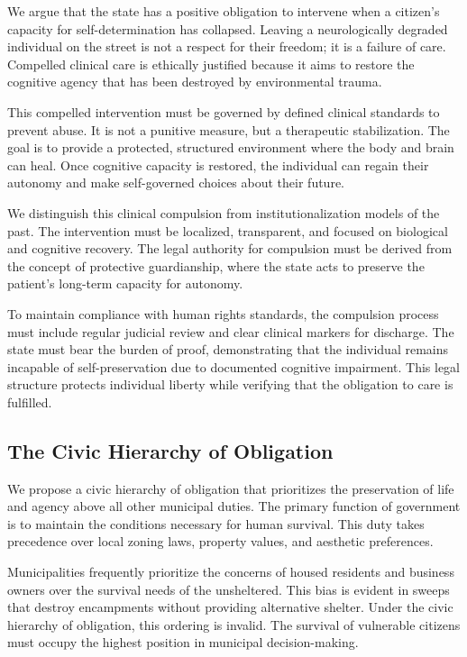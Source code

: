 \documentclass[12pt]{article}
\begin{document}
We argue that the state has a positive obligation to intervene when a citizen's capacity for self-determination has collapsed. Leaving a neurologically degraded individual on the street is not a respect for their freedom; it is a failure of care. Compelled clinical care is ethically justified because it aims to restore the cognitive agency that has been destroyed by environmental trauma.

This compelled intervention must be governed by defined clinical standards to prevent abuse. It is not a punitive measure, but a therapeutic stabilization. The goal is to provide a protected, structured environment where the body and brain can heal. Once cognitive capacity is restored, the individual can regain their autonomy and make self-governed choices about their future.

We distinguish this clinical compulsion from institutionalization models of the past. The intervention must be localized, transparent, and focused on biological and cognitive recovery. The legal authority for compulsion must be derived from the concept of protective guardianship, where the state acts to preserve the patient's long-term capacity for autonomy.

To maintain compliance with human rights standards, the compulsion process must include regular judicial review and clear clinical markers for discharge. The state must bear the burden of proof, demonstrating that the individual remains incapable of self-preservation due to documented cognitive impairment. This legal structure protects individual liberty while verifying that the obligation to care is fulfilled.

\subsection{The Civic Hierarchy of Obligation}
We propose a civic hierarchy of obligation that prioritizes the preservation of life and agency above all other municipal duties. The primary function of government is to maintain the conditions necessary for human survival. This duty takes precedence over local zoning laws, property values, and aesthetic preferences.

Municipalities frequently prioritize the concerns of housed residents and business owners over the survival needs of the unsheltered. This bias is evident in sweeps that destroy encampments without providing alternative shelter. Under the civic hierarchy of obligation, this ordering is invalid. The survival of vulnerable citizens must occupy the highest position in municipal decision-making.
\end{document}

